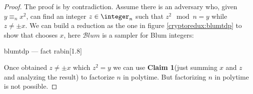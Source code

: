 \begin{proof}
    The proof is by contradiction. Assume there is an adversary \adversary{} who, given $y \equiv_n x^2$, can find an integer $z \in \integer_n$ such that $z^2 \mod n = y$ while $z \neq \pm x$. We can build a reduction as the one in figure \ref{cryptoredux:blumtdp} to show that \adversary{} chooses $x$, here $\mathcal{B}lum$ is a sampler for Blum integers:

    \begin{cryptoredux}
        {blumtdp}
        {---}
        {fact}
        {rabin}[1.8]


        \cseqdelay


        \cseqdelay

        
    \end{cryptoredux}

    
    Once obtained $z\neq \pm x$ which $z^{2}=y$ we can use \textbf{Claim 1}(just summing $x$ and $z$ and analyzing the result)  to factorize $n$ in polytime. But factorizing $n$ in polytime is not possible.
\end{proof}
